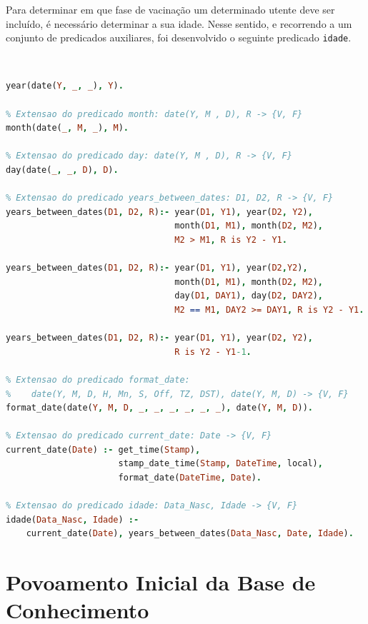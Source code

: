 \documentclass[a4paper, 11pt]{article}
\begin{document}
Para determinar em que fase de vacinação um determinado utente deve ser incluído, é necessário determinar a sua idade.
Nesse sentido, e recorrendo a um conjunto de predicados auxiliares, foi desenvolvido o seguinte predicado \texttt{idade}.

\

\begin{lstlisting}[language=Prolog, caption={Predicados auxiliares que permitem determinar a idade de um utente}]
% Extensao do predicado year: date(Y, M , D), R -> {V, F}
year(date(Y, _, _), Y).

% Extensao do predicado month: date(Y, M , D), R -> {V, F}
month(date(_, M, _), M).

% Extensao do predicado day: date(Y, M , D), R -> {V, F}
day(date(_, _, D), D).

% Extensao do predicado years_between_dates: D1, D2, R -> {V, F}
years_between_dates(D1, D2, R):- year(D1, Y1), year(D2, Y2),
                                 month(D1, M1), month(D2, M2),
                                 M2 > M1, R is Y2 - Y1.
                                 
years_between_dates(D1, D2, R):- year(D1, Y1), year(D2,Y2),
                                 month(D1, M1), month(D2, M2),
                                 day(D1, DAY1), day(D2, DAY2),
                                 M2 == M1, DAY2 >= DAY1, R is Y2 - Y1.
                                 
years_between_dates(D1, D2, R):- year(D1, Y1), year(D2, Y2),
                                 R is Y2 - Y1-1.

% Extensao do predicado format_date:
%    date(Y, M, D, H, Mn, S, Off, TZ, DST), date(Y, M, D) -> {V, F}
format_date(date(Y, M, D, _, _, _, _, _, _), date(Y, M, D)).

% Extensao do predicado current_date: Date -> {V, F}
current_date(Date) :- get_time(Stamp),
                      stamp_date_time(Stamp, DateTime, local),
                      format_date(DateTime, Date).

% Extensao do predicado idade: Data_Nasc, Idade -> {V, F}
idade(Data_Nasc, Idade) :- 
    current_date(Date), years_between_dates(Data_Nasc, Date, Idade).
\end{lstlisting}

\pagebreak

\section{Povoamento Inicial da Base de Conhecimento}
\end{document}
